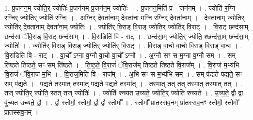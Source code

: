 \documentclass[17pt]{extarticle}
\begin{document}
1. प्र॒जन॑न॒म् ज्योति॒र् ज्योतिः॑ प्र॒जन॑नम् प्र॒जन॑न॒म् ज्योतिः॑ । . प्र॒जन॑न॒मिति॑ प्र - जन॑नम् । . ज्योति॑ र॒ग्नि र॒ग्निर् ज्योति॒र् ज्योति॑ र॒ग्निः । . अ॒ग्निर् दे॒वता॑नाम् दे॒वता॑ना म॒ग्नि र॒ग्निर् दे॒वता॑नाम् । . दे॒वता॑ना॒म् ज्योति॒र् ज्योति॑र् दे॒वता॑नाम् दे॒वता॑ना॒म् ज्योतिः॑ । . ज्योति॑र् वि॒राड् वि॒राड् ज्योति॒र् ज्योति॑र् वि॒राट् । . वि॒राट् छन्द॑सा॒म् छन्द॑सां ॅवि॒राड् वि॒राट् छन्द॑साम् । . वि॒राडिति॑ वि - राट् । . छन्द॑सा॒म् ज्योति॒र् ज्योति॒ श्छन्द॑सा॒म् छन्द॑सा॒म् ज्योतिः॑ । . ज्योति॑र् वि॒राड् वि॒राड् ज्योति॒र् ज्योति॑र् वि॒राट् । . वि॒राड् वा॒चो वा॒चो वि॒राड् वि॒राड् वा॒चः । . वि॒राडिति॑ वि - राट् । . वा॒चो᳚ ऽग्ना व॒ग्नौ वा॒चो वा॒चो᳚ ऽग्नौ । . अ॒ग्नौ सꣳ स म॒ग्ना व॒ग्नौ सम् । . सम् ति॑ष्ठते तिष्ठते॒ सꣳ सम् ति॑ष्ठते । . ति॒ष्ठ॒ते॒ वि॒राजं॑ ॅवि॒राज॑म् तिष्ठते तिष्ठते वि॒राज᳚म् । . वि॒राज॑ म॒भ्य॑भि वि॒राजं॑ ॅवि॒राज॑ म॒भि । . वि॒राज॒मिति॑ वि - राज᳚म् । . अ॒भि सꣳ स म॒भ्य॑भि सम् । . सम् प॑द्यते पद्यते॒ सꣳ सम् प॑द्यते । . प॒द्य॒ते॒ तस्मा॒त् तस्मा᳚त् पद्यते पद्यते॒ तस्मा᳚त् । . तस्मा॒त् तत् तत् तस्मा॒त् तस्मा॒त् तत् । . तज् ज्योति॒र् ज्योति॒ स्तत् तज् ज्योतिः॑ । . ज्योति॑ रुच्यत उच्यते॒ ज्योति॒र् ज्योति॑ रुच्यते । . उ॒च्य॒ते॒ द्वौ द्वा वु॑च्यत उच्यते॒ द्वौ । . द्वौ स्तोमौ॒ स्तोमौ॒ द्वौ द्वौ स्तोमौ᳚ । . स्तोमौ᳚ प्रातस्सव॒नम् प्रा॑तस्सव॒नꣳ स्तोमौ॒ स्तोमौ᳚ प्रातस्सव॒नम् । \newline
\end{document}
